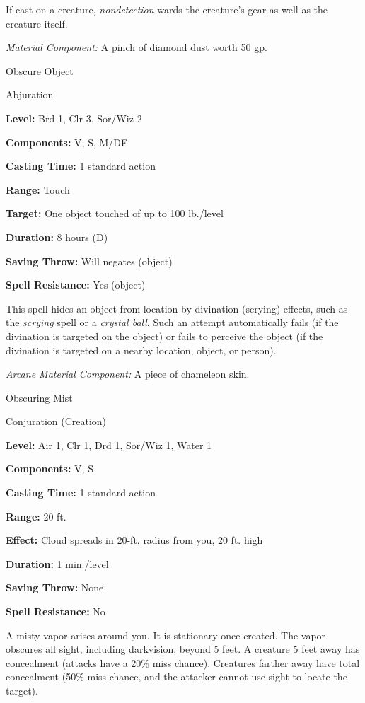 \documentclass{article}
\begin{document}
If cast on a creature, \textit{nondetection }wards the creature's gear as well 
as the creature itself.

\textit{Material Component: }A pinch of diamond dust worth 50 gp.

\vspace{12pt}
Obscure Object

Abjuration

\textbf{Level:} Brd 1, Clr 3, Sor/Wiz 2

\textbf{Components:} V, S, M/DF

\textbf{Casting Time:} 1 standard action

\textbf{Range:} Touch

\textbf{Target:} One object touched of up to 100 lb./level

\textbf{Duration:} 8 hours (D)

\textbf{Saving Throw: }Will negates (object)

\textbf{Spell Resistance:} Yes (object)

This spell hides an object from location by divination (scrying) effects, such 
as the \textit{scrying }spell or a \textit{crystal ball}. Such an attempt automatically 
fails (if the divination is targeted on the object) or fails to perceive the object 
(if the divination is targeted on a nearby location, object, or person).

\textit{Arcane Material Component: }A piece of chameleon skin.

\vspace{12pt}
Obscuring Mist

Conjuration (Creation)

\textbf{Level:} Air 1, Clr 1, Drd 1, Sor/Wiz 1, Water 1

\textbf{Components:} V, S

\textbf{Casting Time:} 1 standard action

\textbf{Range:} 20 ft.

\textbf{Effect:} Cloud spreads in 20-ft. radius from you, 20 ft. high

\textbf{Duration:} 1 min./level

\textbf{Saving Throw:} None

\textbf{Spell Resistance:} No

A misty vapor arises around you. It is stationary once created. The vapor obscures 
all sight, including darkvision, beyond 5 feet. A creature 5 feet away has concealment 
(attacks have a 20\% miss chance). Creatures farther away have total concealment 
(50\% miss chance, and the attacker cannot use sight to locate the target).
\end{document}
